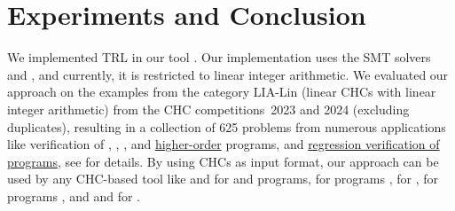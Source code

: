 \section{Experiments and Conclusion}
\label{sec:experiments}

We implemented TRL in our tool  \cite{loat}.
%
Our implementation uses the SMT solvers  \cite{yices} and  \cite{z3}, and currently, it is restricted to linear integer arithmetic.
%
We evaluated our approach on the examples from the category LIA-Lin (linear CHCs with linear integer arithmetic) from the CHC competitions~2023 and 2024 \cite{CHC-COMP} (excluding duplicates), resulting in a collection of 625 problems from numerous applications like verification of \href{https://github.com/chc-comp/hcai-bench}{}, \href{https://github.com/chc-comp/rust-horn}{}, \href{https://github.com/chc-comp/jayhorn-benchmarks}{}, and \href{https://github.com/chc-comp/hopv}{higher-order} programs, and \href{https://github.com/mattulbrich/llreve}{regression verification of  programs},
%
see \cite{chc-comp23,chc-comp24} for details.
%
By using CHCs as input format, our approach can be used by any CHC-based tool like  \cite{korn} and  \cite{seahorn} for  and \CXX{} programs,  for  programs \cite{jayhorn},  for  \cite{horndroid},  for  programs \cite{rusthorn}, and  \cite{smartACE} and  \cite{solcmc} for .

